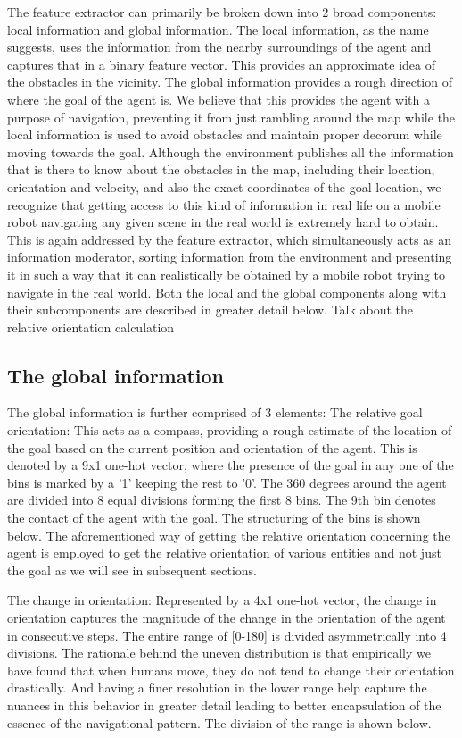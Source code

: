 The feature extractor can primarily be broken down into 2 broad components: local information and global information. The local information, as the name suggests, uses the information from the nearby surroundings of the agent and captures that in a binary feature vector. This provides an approximate idea of the obstacles in the vicinity. The global information provides a rough direction of where the goal of the agent is. We believe that this provides the agent with a purpose of navigation, preventing it from just rambling around the map while the local information is used to avoid obstacles and maintain proper decorum while moving towards the goal.
Although the environment publishes all the information that is there to know about the obstacles in the map, including their location, orientation and velocity, and also the exact coordinates of the goal location, we recognize that getting access to this kind of information in real life on a mobile robot navigating any given scene in the real world is extremely hard to obtain. 
This is again addressed by the feature extractor, which simultaneously acts as an information moderator, sorting information from the environment and presenting it in such a way that it can realistically be obtained by a mobile robot trying to navigate in the real world.
Both the local and the global components along with their subcomponents are described in greater detail below.
Talk about the relative orientation calculation


\subsection*{The global information}
The global information is further comprised of 3 elements:
The relative goal orientation: 
This acts as a compass, providing a rough estimate of the location of the goal based on the current position and orientation of the agent. This is denoted by a 9x1 one-hot vector, where the presence of the goal in any one of the bins is marked by a '1' keeping the rest to '0'. The 360 degrees around the agent are divided into 8 equal divisions forming the first 8 bins. The 9th bin denotes the contact of the agent with the goal. The structuring of the bins is shown below. 
The aforementioned way of getting the relative orientation concerning the agent is employed to get the relative orientation of various entities and not just the goal as we will see in subsequent sections.

The change in orientation: Represented by a 4x1 one-hot vector, the change in orientation captures the magnitude of the change in the orientation of the agent in consecutive steps. The entire range of [0-180] is divided asymmetrically into 4 divisions. The rationale behind the uneven distribution is that empirically we have found that when humans move,  they do not tend to change their orientation drastically. And having a finer resolution in the lower range help capture the nuances in this behavior in greater detail leading to better encapsulation of the essence of the navigational pattern. The division of the range is shown below.

